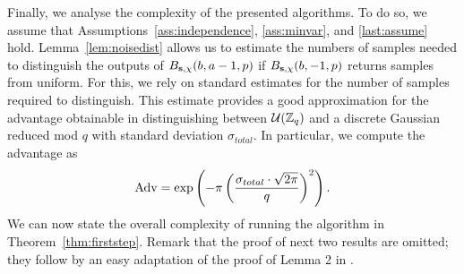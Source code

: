 Finally, we analyse the complexity of the presented algorithms. To do so, we assume that Assumptions~\ref{ass:independence}, 
\ref{ass:minvar}, and \ref{last:assume} hold. Lemma~\ref{lem:noisedist} allows us to estimate the numbers of samples needed to distinguish the outputs of $B_{\mathbf{s},\chi}(b,a-1,p)$ if $B_{\mathbf{s},\chi}(b,-1,p)$ returns \LWE samples from uniform. For this, we rely on standard estimates \cite{LindnerP10} for the number of samples required to distinguish. 
This estimate provides a good approximation for the advantage obtainable in distinguishing between $\mathcal{U}(\mathbb{Z}_q)$ and a discrete Gaussian 
reduced mod $q$ with standard deviation $\sigma_{total}$. In particular, we compute the advantage as
$$\textnormal{Adv}  = \exp\left(-\pi \left(\frac{\sigma_{total} \cdot \sqrt{2\pi}}{q}\right)^2\right).$$
We can now state the overall complexity of running the algorithm in Theorem~\ref{thm:firststep}.
Remark that the proof of next two results are  omitted; they  
follow by an easy adaptation of the proof of Lemma 2 in \cite{albrecht-cid-faugere-fitzpatrick-perret:dcc2013}.

\def\naddssteponeT{\frac{p_{{\rm small}}^b}{2}\cdot \left(  \frac{a(a-1)}{2}\cdot (n+1) \right)}
\def\naddssteponeM{\left(m + m^\ast\right)\, n \, a}

\def\ncallsT{a\cdot \left(\frac{p_{{\rm small}}^b}{2}\right)}

